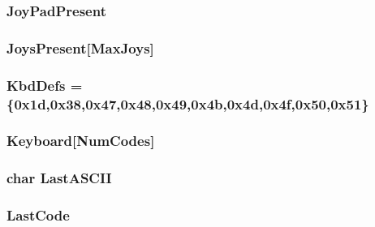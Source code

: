 \label{ID__IN_8C_a9a0430b044ebc95c3a6fab27fd89531f}
\hypertarget{ID__IN_8C_a2d43a4f05f8981ea5e2a4f087fe775c5}{
\subsubsection[{JoyPadPresent}]{ {\bf JoyPadPresent}}}
\label{ID__IN_8C_a2d43a4f05f8981ea5e2a4f087fe775c5}
\hypertarget{ID__IN_8C_a954105121102803577bc52b8f0e733cd}{
\subsubsection[{JoysPresent}]{ {\bf JoysPresent}\mbox{[}MaxJoys\mbox{]}}}
\label{ID__IN_8C_a954105121102803577bc52b8f0e733cd}
\hypertarget{ID__IN_8C_a27c5715e087f17739848d747929a11ae}{
\subsubsection[{KbdDefs}]{ {\bf KbdDefs} = \{0x1d,0x38,0x47,0x48,0x49,0x4b,0x4d,0x4f,0x50,0x51\}}}
\label{ID__IN_8C_a27c5715e087f17739848d747929a11ae}
\hypertarget{ID__IN_8C_af2090fe8236764c1093020b141ca4ddd}{
\subsubsection[{Keyboard}]{ {\bf Keyboard}\mbox{[}NumCodes\mbox{]}}}
\label{ID__IN_8C_af2090fe8236764c1093020b141ca4ddd}
\hypertarget{ID__IN_8C_ae0bac1d5b862fc73354b6992e25e9207}{
\subsubsection[{LastASCII}]{\setlength{\rightskip}{0pt plus 5cm}char {\bf LastASCII}}}
\label{ID__IN_8C_ae0bac1d5b862fc73354b6992e25e9207}
\hypertarget{ID__IN_8C_a767f91c4e83781f8bea2b3e65e2fa142}{
\subsubsection[{LastCode}]{ {\bf LastCode}}}
